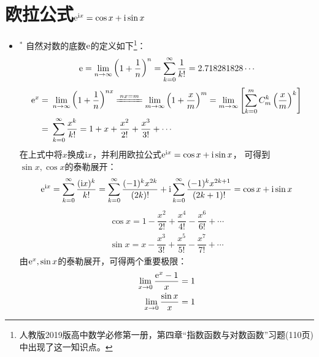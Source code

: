 

\section{欧拉公式$ \mathrm{e}^{\mathrm{i} x}=\cos x+\mathrm{i}\sin x $}
\begin{itemize}[leftmargin=\inteval{\myitemleftmargin}pt,itemsep=
   \inteval{\myitemitempsep}pt,topsep=\inteval{\myitemtopsep}pt]
\item $^*$ 自然对数的底数$ \mathrm{e} $的定义如下\footnote{人教版2019版高中数学必修第一册，第四章“指数函数与对数函数”习题(110页)中出现了这一知识点。}：
\begin{align}\label{e的定义}
\mathrm{e}=\lim_{n\to \infty}\left( 1+\dfrac{1}{n}\right)^n
=\sum_{k=0}^{\infty}\dfrac{1}{k!}= 2.718281828 \cdots
\end{align}
\begin{align}
\e^x=&\ \lim_{n\to\infty}\left(1+ \dfrac{1}{n}\right)^{nx}\xlongequal{nx=m}
\lim_{m\to\infty}\left(1+\dfrac{x}{m}\right)^{m}=\lim_{m\to\infty}
\left[\sum_{k=0}^{m}C_m^k\left(\dfrac{x}{m}\right)^k\right]\\
=&\ \sum_{k=0}^{\infty}\dfrac{x^k}{k!}=1+x+\dfrac{x^2}{2!}+\dfrac{x^3}{3!}+\cdots
\label{ex泰勒展开}
\end{align}
在上式中将$ x $换成$\mathrm{i} x$，并利用欧拉公式$ \mathrm{e}^{\mathrm{i} x}=\cos x+\mathrm{i}\sin x $，
可得到$ \sin x, \cos x $的泰勒展开：
\begin{gather*}
\mathrm{e}^{\mathrm{i} x} = \sum_{k=0}^{\infty}\dfrac{(\mathrm{i} x)^k}{k!}= \sum_{k=0}^{\infty}\dfrac{(-1)^k x^{2k}}{(2k)!}+
\mathrm{i}\sum_{k=0}^{\infty}\dfrac{(-1)^k x^{2k+1}}{(2k+1)!}=\cos x+\mathrm{i}\sin x 
\end{gather*}  
\begin{gather}  
\cos x=1-\dfrac{x^2}{2!}+\dfrac{x^4}{4!}-\dfrac{x^6}{6!}+\cdots 
\label{余弦泰勒展开} \\
\sin x=x-\dfrac{x^3}{3!}+\dfrac{x^5}{5!}-\dfrac{x^7}{7!}+\cdots 
\label{正弦泰勒展开}
\end{gather}
由$ \mathrm{e}^x,\sin x $的泰勒展开，可得两个重要极限：
\begin{align}
\lim_{x\to 0}\dfrac{\mathrm{e}^x-1}{x}=1  \label{(e^x-1)/x极限} \\
\lim_{x\to 0}\dfrac{\sin x}{x}=1  \label{sinx/x极限}
\end{align}


\end{itemize}
